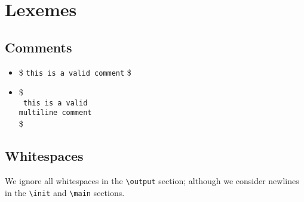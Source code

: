 \chapter{Lexemes}\label{ch:Lexemes}

                                                                                                                                                                                  
\section{Comments}                                                                                                                                                                  
\begin{itemize}                                                                                                                                                                                
    \item \$ \texttt{this is a valid comment} \$                                                                                                                                                        
    \item \$\\  \texttt{                                                                                                                                                                               
    this is a valid \\                                                                                                                                                                         
    multiline comment\\    }                                                                                                                                                                    
    \$                                                                                                                                                                                         
\end{itemize}                                                                                                                                                                                  

\section{Whitespaces}                                                                                                                                                                
We ignore all whitespaces in the \texttt{\textbackslash output} section; although we consider newlines in the \texttt{\textbackslash init} and \texttt{\textbackslash main} sections. 

